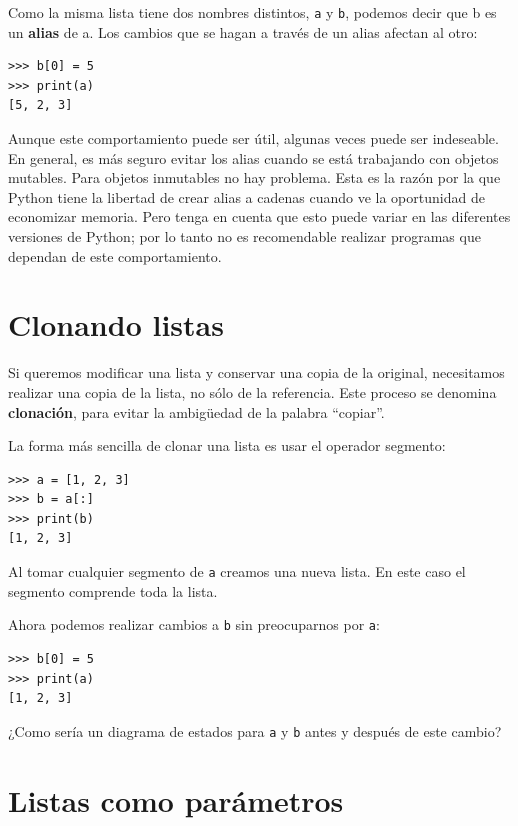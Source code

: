 Como la misma lista tiene dos nombres distintos, \texttt{a} y \texttt{b},
podemos decir que b es un \textbf{alias} de a. Los cambios que se
hagan a través de un alias afectan al otro:
\begin{verbatim}
>>> b[0] = 5
>>> print(a)
[5, 2, 3]
\end{verbatim}

Aunque este comportamiento puede ser útil, algunas veces puede ser
indeseable. En general, es más seguro evitar los alias cuando se está
trabajando con objetos mutables. Para objetos inmutables no hay problema.
Esta es la razón por la que Python tiene la libertad de crear alias
a cadenas cuando ve la oportunidad de economizar memoria. Pero tenga
en cuenta que esto puede variar en las diferentes versiones de Python;
por lo tanto no es recomendable realizar programas que dependan de
este comportamiento.

\section{Clonando listas}

 

Si queremos modificar una lista y conservar una copia de la original,
necesitamos realizar una copia de la lista, no sólo de la referencia.
Este proceso se denomina \textbf{clonación}, para evitar la ambigüedad
de la palabra ``copiar''.

La forma más sencilla de clonar una lista es usar el operador segmento:
\begin{verbatim}
>>> a = [1, 2, 3]
>>> b = a[:]
>>> print(b)
[1, 2, 3]
\end{verbatim}

Al tomar cualquier segmento de \texttt{a} creamos una nueva lista.
En este caso el segmento comprende toda la lista.

Ahora podemos realizar cambios a \texttt{b} sin preocuparnos por \texttt{a}:
\begin{verbatim}
>>> b[0] = 5
>>> print(a)
[1, 2, 3]
\end{verbatim}

¿Como sería un diagrama de estados para \texttt{a} y \texttt{b} antes
y después de este cambio? 

\section{Listas como parámetros}

  

